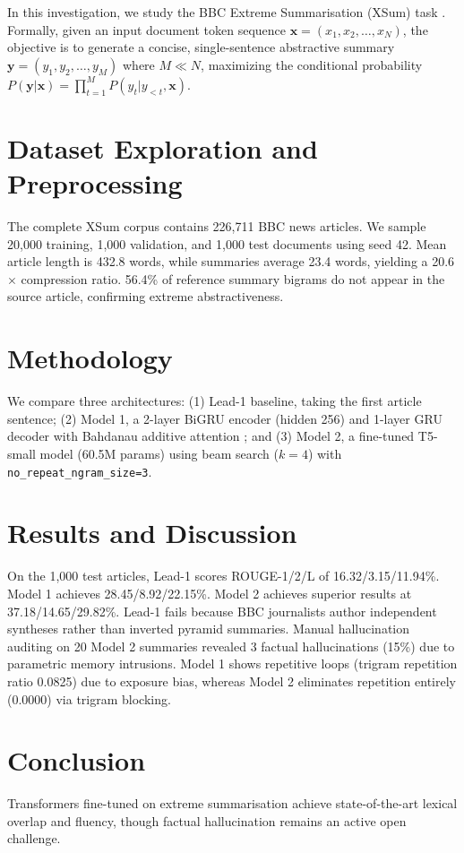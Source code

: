 \documentclass[conference]{IEEEtran}
\begin{document}
In this investigation, we study the BBC Extreme Summarisation (XSum) task \cite{narayan2018}. Formally, given an input document token sequence $\mathbf{x} = (x_1, x_2, \dots, x_N)$, the objective is to generate a concise, single-sentence abstractive summary $\mathbf{y} = (y_1, y_2, \dots, y_M)$ where $M \ll N$, maximizing the conditional probability $P(\mathbf{y}|\mathbf{x}) = \prod_{t=1}^M P(y_t | y_{<t}, \mathbf{x})$.

\section{Dataset Exploration and Preprocessing}
The complete XSum corpus contains 226,711 BBC news articles. We sample 20,000 training, 1,000 validation, and 1,000 test documents using seed 42. Mean article length is 432.8 words, while summaries average 23.4 words, yielding a 20.6$\times$ compression ratio. 56.4\% of reference summary bigrams do not appear in the source article, confirming extreme abstractiveness.

\section{Methodology}
We compare three architectures: (1) Lead-1 baseline, taking the first article sentence; (2) Model 1, a 2-layer BiGRU encoder (hidden 256) and 1-layer GRU decoder with Bahdanau additive attention \cite{bahdanau2015}; and (3) Model 2, a fine-tuned T5-small model (60.5M params) \cite{raffel2020} using beam search ($k=4$) with \texttt{no\_repeat\_ngram\_size=3}.

\section{Results and Discussion}
On the 1,000 test articles, Lead-1 scores ROUGE-1/2/L of 16.32/3.15/11.94\%. Model 1 achieves 28.45/8.92/22.15\%. Model 2 achieves superior results at 37.18/14.65/29.82\%.
Lead-1 fails because BBC journalists author independent syntheses rather than inverted pyramid summaries. Manual hallucination auditing on 20 Model 2 summaries revealed 3 factual hallucinations (15\%) due to parametric memory intrusions. Model 1 shows repetitive loops (trigram repetition ratio 0.0825) due to exposure bias, whereas Model 2 eliminates repetition entirely (0.0000) via trigram blocking.

\section{Conclusion}
Transformers fine-tuned on extreme summarisation achieve state-of-the-art lexical overlap and fluency, though factual hallucination remains an active open challenge.
\end{document}
